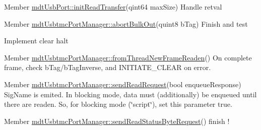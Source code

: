 \label{todo__todo000037}
\hypertarget{todo__todo000037}{}
 
\begin{DoxyDescription}
\item[Member \hyperlink{classmdt_usb_port_a5e380852b8726f71e8558c86cba5bd1f}{mdtUsbPort::initReadTransfer}(qint64 maxSize) ]Handle retval 
\end{DoxyDescription}

\label{todo__todo000046}
\hypertarget{todo__todo000046}{}
 
\begin{DoxyDescription}
\item[Member \hyperlink{classmdt_usbtmc_port_manager_af412ba1b1e7e56ebecd2e59cb6bf607a}{mdtUsbtmcPortManager::abortBulkOut}(quint8 bTag) ]Finish and test 

Implement clear halt 
\end{DoxyDescription}

\label{todo__todo000048}
\hypertarget{todo__todo000048}{}
 
\begin{DoxyDescription}
\item[Member \hyperlink{classmdt_usbtmc_port_manager_aca42b343ae1f6a324e6e45968f03bbea}{mdtUsbtmcPortManager::fromThreadNewFrameReaden}() ]On complete frame, check bTag/bTagInverse, and INITIATE\_\-CLEAR on error. 
\end{DoxyDescription}

\label{todo__todo000049}
\hypertarget{todo__todo000049}{}
 
\begin{DoxyDescription}
\item[Member \hyperlink{classmdt_usbtmc_port_manager_ab1604a1c8f2e9192714d039dbf9a5158}{mdtUsbtmcPortManager::sendReadRequest}(bool enqueueResponse) ]SigName is emited. In blocking mode, data must (additionally) be enqueued until there are readen. So, for blocking mode (\char`\"{}script\char`\"{}), set this parameter true. 
\end{DoxyDescription}

\label{todo__todo000045}
\hypertarget{todo__todo000045}{}
 
\begin{DoxyDescription}
\item[Member \hyperlink{classmdt_usbtmc_port_manager_a7bcc280bd4a26ed523832550b1e61553}{mdtUsbtmcPortManager::sendReadStatusByteRequest}() ]finish ! 
\end{DoxyDescription}